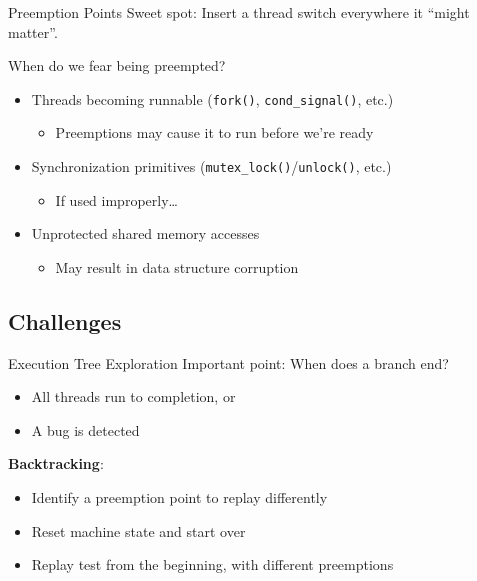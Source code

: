 \documentclass[xcolor=dvipsnames]{beamer}
\begin{document}
\begin{frame}{Preemption Points}
	Sweet spot: Insert a thread switch everywhere it ``might matter''.

	\linegap
	When do we fear being preempted?
	\begin{itemize}
		\item Threads becoming runnable (\texttt{fork()}, \texttt{cond\_signal()}, etc.)
			\begin{itemize}
				\item Preemptions may cause it to run before we're ready
			\end{itemize}
		\item Synchronization primitives (\texttt{mutex\_lock()}/\texttt{unlock()}, etc.)
			\begin{itemize}
				\item If used improperly\ldots
			\end{itemize}
		\item Unprotected shared memory accesses %
			\begin{itemize}
				\item May result in data structure corruption
			\end{itemize}
	\end{itemize}
	\linegap

\end{frame}

\subsection{Challenges}


\begin{frame}{Execution Tree Exploration}
	Important point: When does a branch end?
	\begin{itemize}
		\item All threads run to completion, or
		\item A bug is detected %
	\end{itemize}
	\linegap
	{\bf Backtracking}:
	\begin{itemize}
		\item Identify a preemption point to replay differently
		\item Reset machine state and start over
		\item Replay test from the beginning, with different preemptions
	\end{itemize}
\end{frame}
\end{document}
